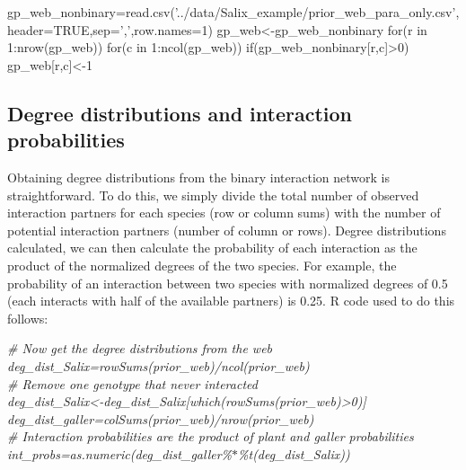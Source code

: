 \documentclass[12pt]{article}
\begin{document}

      gp_web_nonbinary=read.csv('../data/Salix_example/prior_web_para_only.csv',header=TRUE,sep=',',row.names=1)
      gp_web<-gp_web_nonbinary
      for(r in 1:nrow(gp_web)){
      for(c in 1:ncol(gp_web)){
      if(gp_web_nonbinary[r,c]>0){
      gp_web[r,c]<-1
      }
      }
      }

    \subsection*{Degree distributions and interaction probabilities}

      Obtaining degree distributions from the binary interaction 
      network is straightforward. To do this, we simply divide the 
      total number of observed interaction partners for each 
      species (row or column sums) with the number of potential 
      interaction partners (number of column or rows). Degree 
      distributions calculated, we can then calculate the 
      probability of each interaction as the product of the 
      normalized degrees of the two species. For example, the 
      probability of an interaction between two species with 
      normalized degrees of 0.5 (each interacts with half of the 
      available partners) is 0.25. R code used to do this follows:


      \vspace{12pt}
      \emph{
      \noindent \hspace{-4pt} \# Now get the degree distributions from the web\\
      deg\_dist\_Salix=rowSums(prior\_web)/ncol(prior\_web)\\
      \# Remove one genotype that never interacted\\
      deg\_dist\_Salix\textless-deg\_dist\_Salix[which(rowSums(prior\_web)\textgreater0)]\\
      deg\_dist\_galler=colSums(prior\_web)/nrow(prior\_web)\\
      \# Interaction probabilities are the product of plant and galler probabilities\\
      int\_probs=as.numeric(deg\_dist\_galler\%$*$\%t(deg\_dist\_Salix))\\
      }
\end{document}
